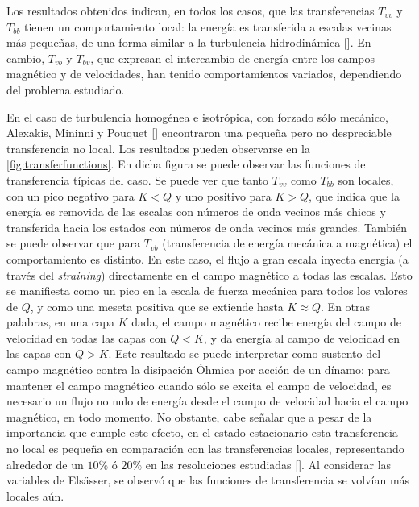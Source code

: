 Los resultados obtenidos indican, en todos los casos, que las
transferencias $T_{vv}$ y $T_{bb}$ tienen un comportamiento local: la
energía es transferida a escalas vecinas más pequeñas, de una forma
similar a la turbulencia hidrodinámica [\cite{alexakis_imprint_2005,
  mininni_large_2006}]. En cambio, $T_{vb}$ y $T_{bv}$, que expresan el
intercambio de energía entre los campos magnético y de velocidades,
han tenido comportamientos variados, dependiendo del problema
estudiado.

En el caso de turbulencia homogénea e isotrópica, con forzado sólo
mecánico, Alexakis, Mininni y Pouquet [\cite{alexakis_imprint_2005}]
encontraron una pequeña pero no despreciable transferencia no
local. Los resultados pueden observarse en la
\cref{fig:transferfunctions}. En dicha figura se puede observar las
funciones de transferencia típicas del caso. Se puede ver que tanto
$T_{vv}$ como $T_{bb}$ son locales, con un pico negativo para $K<Q$ y
uno positivo para $K>Q$, que indica que la energía es removida de las
escalas con números de onda vecinos más chicos y transferida hacia los
estados con números de onda vecinos más grandes. También se puede
observar que para $T_{vb}$ (transferencia de energía mecánica a
magnética) el comportamiento es distinto. En este caso, el flujo a
gran escala inyecta energía (a través del \textit{straining})
directamente en el campo magnético a todas las escalas. Esto se
manifiesta como un pico en la escala de fuerza mecánica para todos los
valores de $Q$, y como una meseta positiva que se extiende hasta
$K\approx Q$.  En otras palabras, en una capa $K$ dada, el campo
magnético recibe energía del campo de velocidad en todas las capas con
$Q<K$, y da energía al campo de velocidad en las capas con $Q>K$. Este
resultado se puede interpretar como sustento del campo magnético
contra la disipación Óhmica por acción de un dínamo: para mantener el
campo magnético cuando sólo se excita el campo de velocidad, es
necesario un flujo no nulo de energía desde el campo de velocidad
hacia el campo magnético, en todo momento. No obstante, cabe señalar
que a pesar de la importancia que cumple este efecto, en el estado
estacionario esta transferencia no local es pequeña en comparación con
las transferencias locales, representando alrededor de un $10\%$ ó
$20\%$ en las resoluciones estudiadas [\cite{mininni_large_2006}]. Al
considerar las variables de Els\"asser, se observó que las funciones
de transferencia se volvían más locales aún.
